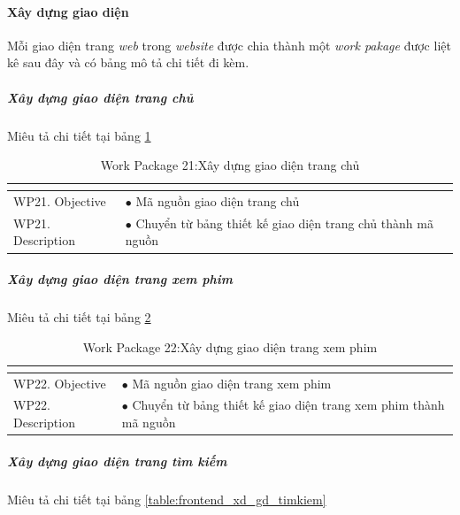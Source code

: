\documentclass[a4paper]{book}
\begin{document}
\paragraph{Xây dựng giao diện}
Mỗi giao diện trang \textit{web} trong \textit{website} được chia thành một \textit{work pakage} được liệt kê sau đây và có bảng mô tả chi tiết đi kèm.
\subparagraph{Xây dựng giao diện trang chủ} Miêu tả chi tiết tại bảng \ref{table:frontend_xd_gd_trangchu}
\begin{table}[h!]
	\begin{center}
		\begin{tabular}{|p{4cm}|p{10cm}|}
			\hline
			\multicolumn{2}{|c|}{\cellcolor[HTML]{363636}{\color[HTML]{FFFFFF}Work package 21: Xây dựng giao diện trang chủ}}\\
			\hline
			\multirow{1}{*}{WP21. Objective} & $\bullet$ Mã nguồn giao diện trang chủ\\
			\hline
			\multirow{1}{*}{WP21. Description} & $\bullet$ Chuyển từ bảng thiết kế giao diện trang chủ thành mã nguồn \\
			\hline
		\end{tabular}
		\caption{Work Package 21:Xây dựng giao diện trang chủ}
		\label{table:frontend_xd_gd_trangchu}
	\end{center}
\end{table}
\subparagraph{Xây dựng giao diện trang xem phim} Miêu tả chi tiết tại bảng \ref{table:frontend_xd_gd_xemphim}
\begin{table}[h!]
	\begin{center}
		\begin{tabular}{|p{4cm}|p{10cm}|}
			\hline
			\multicolumn{2}{|c|}{\cellcolor[HTML]{363636}{\color[HTML]{FFFFFF}Work package 22: Xây dựng giao diện trang xem phim}}\\
			\hline
			\multirow{1}{*}{WP22. Objective} & $\bullet$ Mã nguồn giao diện trang xem phim\\
			\hline
			\multirow{1}{*}{WP22. Description} & $\bullet$ Chuyển từ bảng thiết kế giao diện trang xem phim thành mã nguồn \\
			\hline
		\end{tabular}
		\caption{Work Package 22:Xây dựng giao diện trang xem phim}
		\label{table:frontend_xd_gd_xemphim}
	\end{center}
\end{table}
\subparagraph{Xây dựng giao diện trang tìm kiếm} Miêu tả chi tiết tại bảng \ref{table:frontend_xd_gd_timkiem}
\end{document}
